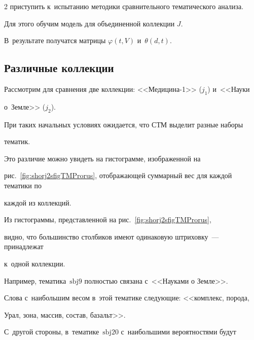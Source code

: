 \begin{multicols}{2}
приступить к~испытанию методики сравнительного тематического анализа.


    Для этого обучим модель для объединенной коллекции $J$.


    В~результате получатся матрицы $\varphi (t,V)$ и~$\theta (d,t)$.


    


    \pagebreak


  


    \subsection{Различные коллекции}


    


    


    Рассмотрим для сравнения две коллекции: <<Медицина-1>> ($j_1$)  и~<<Науки 


о~Земле>> ($j_2$).


    При таких начальных условиях ожидается, что СТМ выделит разные наборы 


тематик.


Это различие можно увидеть на гистограмме, изоб\-ра\-жен\-ной на 


рис.~\ref{fig:shorj2sfigTMProrus}, отоб\-ра\-жа\-ющей суммарный вес для каждой тематики по 


каждой из коллекций.


    


   





    


    


    Из гистограммы, представленной на рис.~\ref{fig:shorj2sfigTMProrus}, 


видно, что большинство столбиков имеют одинаковую штриховку~--- принадлежат 


к~одной коллекции.


    Например, тематика~$\mathrm{sbj9}$ полностью связана с~<<Науками о Земле>>.


    Слова с~наибольшим весом в~этой тематике следующие:  <<комплекс, порода, 


Урал, зона, массив, состав, базальт>>.


    С~другой стороны, в~тематике~$\mathrm{sbj20}$  с~наибольшими вероятностями будут 



\end{multicols}

